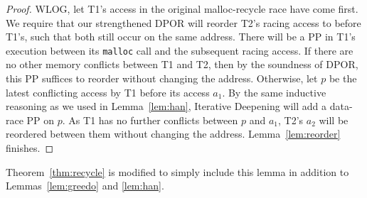 \begin{proof}
WLOG, let T1's access in the original malloc-recycle race have come first.
We require that our strengthened DPOR will reorder T2's racing access to before T1's, such that both still occur on the same address.
There will be a PP in T1's execution between its {\tt malloc} call and the subsequent racing access.
If there are no other memory conflicts between T1 and T2, then by the soundness of DPOR, this PP suffices to reorder without changing the address.
Otherwise, let $p$ be the latest conflicting access by T1 before its access $a_1$.
By the same inductive reasoning as we used in Lemma~\ref{lem:han}, Iterative Deepening will add a data-race PP on $p$.
As T1 has no further conflicts between $p$ and $a_1$, T2's $a_2$ will be reordered between them without changing the address.
Lemma~\ref{lem:reorder} finishes.
\end{proof}

Theorem~\ref{thm:recycle} is modified to simply include this lemma in addition to Lemmas~\ref{lem:greedo} and \ref{lem:han}.

